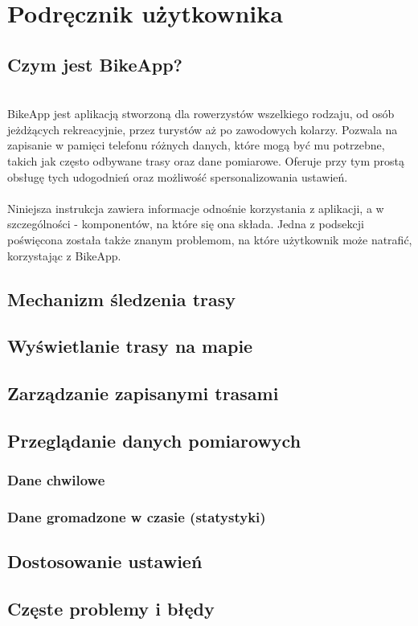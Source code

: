	\newpage
\section{Podręcznik użytkownika}  %

\subsection{Czym jest BikeApp?} %
\hspace{1cm}\\
BikeApp jest aplikacją stworzoną dla rowerzystów wszelkiego rodzaju, od osób jeżdżących rekreacyjnie, przez turystów aż po zawodowych kolarzy. Pozwala na zapisanie w pamięci telefonu różnych danych, które mogą być mu potrzebne, takich jak często odbywane trasy oraz dane pomiarowe. Oferuje przy tym prostą obsługę tych udogodnień oraz możliwość spersonalizowania ustawień.\\
\\
Niniejsza instrukcja zawiera informacje odnośnie korzystania z aplikacji, a w szczególności - komponentów, na które się ona składa. Jedna z podsekcji poświęcona została także znanym problemom, na które użytkownik może natrafić, korzystając z BikeApp.\\

\subsection{Mechanizm śledzenia trasy} %

\subsection{Wyświetlanie trasy na mapie} %

\subsection{Zarządzanie zapisanymi trasami} %

\subsection{Przeglądanie danych pomiarowych} %
\subsubsection{Dane chwilowe} %
\subsubsection{Dane gromadzone w czasie (statystyki)} %

\subsection{Dostosowanie ustawień} %

\subsection{Częste problemy i błędy} %



